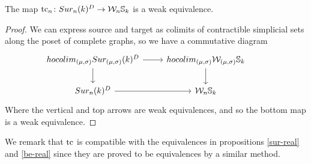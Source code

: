 \begin{corollary}\label{cor-comparing}
	The map $\operatorname{tc}_{n} \colon Sur_{n}(k)^{D}\rightarrow \mathcal{W}_{n}\mathbb{S}_{k}$ is a weak equivalence.
\end{corollary}

\begin{proof}
	We can express source and target as colimits of contractible %
	simplicial sets along the poset of complete graphs,
	so we have a commutative diagram
	\begin{equation*}
		\begin{tikzcd}
			hocolim_{(\mu,\sigma)}\sur_{(\mu,\sigma)}(k)^{D} \arrow[r] \arrow[d]& hocolim_{(\mu,\sigma)}\cW_{(\mu,\sigma)}\sym_{k} \arrow[d] \\
			\sur_{n}(k)^{D}\arrow[r] & \cW_{n}\sym_{k}&
		\end{tikzcd}
	\end{equation*}
	Where the vertical and top arrows
	are weak equivalences, and so the bottom map is a weak equivalence.
\end{proof}

We remark that $\operatorname{tc}$ is compatible with the equivalences in propositions \ref{sur-real} and \ref{be-real} since they are proved to be equivalences by a similar method.





